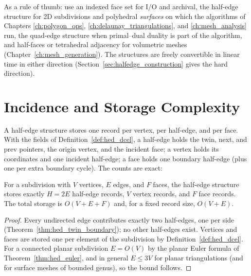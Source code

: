\begin{remark}\label{rem:hed_choice}
As a rule of thumb: use an indexed face set for I/O and archival, the
half-edge structure for 2D subdivisions and polyhedral \emph{surfaces} on
which the algorithms of Chapters
\ref{ch:polygon_ops}, \ref{ch:delaunay_triangulations}, and
\ref{ch:mesh_analysis} run, the quad-edge structure when primal--dual
duality is part of the algorithm, and half-faces or tetrahedral adjacency
for volumetric meshes (Chapter~\ref{ch:mesh_generation}). The structures
are freely convertible in linear time in either direction
(Section~\ref{sec:halfedge_construction} gives the hard direction).
\end{remark}


\section{Incidence and Storage Complexity}
\label{sec:halfedge_complexity}

A half-edge structure stores one record per vertex, per half-edge, and per
face. With the fields of Definition~\ref{def:hed_dcel}, a half-edge holds
the twin, next, and prev pointers, the origin vertex, and the incident
face; a vertex holds its coordinates and one incident half-edge; a face
holds one boundary half-edge (plus one per extra boundary cycle). The
counts are exact:

\begin{theorem}\label{thm:hed_storage}
For a subdivision with $V$ vertices, $E$ edges, and $F$ faces, the
half-edge structure stores exactly $H = 2E$ half-edge records, $V$ vertex
records, and $F$ face records. The total storage is $O(V + E + F)$ and, for
a fixed record size, $O(V + E)$.
\end{theorem}

\begin{proof}
Every undirected edge contributes exactly two half-edges, one per side
(Theorem~\ref{thm:hed_twin_boundary}); no other half-edges exist. Vertices
and faces are stored one per element of the subdivision by
Definition~\ref{def:hed_dcel}. For a connected planar subdivision
$E = O(V)$ by the planar Euler formula of Theorem~\ref{thm:hed_euler}, and
in general $E \leq 3V$ for planar triangulations (and for surface meshes of
bounded genus), so the bound follows.
\end{proof}

